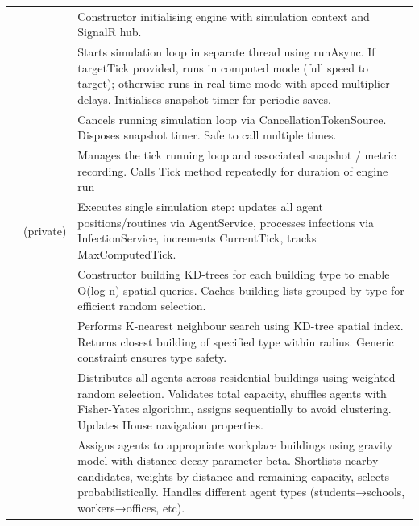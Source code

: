 \begin{longtable}{|L{4cm}|L{4cm}|L{6cm}|}
 & 
 & 
Constructor initialising engine with simulation context and SignalR hub. \\
&  & 
Starts simulation loop in separate thread using runAsync. If targetTick provided, runs in computed mode (full speed to target); otherwise runs in real-time mode with speed multiplier delays. Initialises snapshot timer for periodic saves. \\
&  & 
Cancels running simulation loop via CancellationTokenSource. Disposes snapshot timer. Safe to call multiple times. \\
&  & Manages the tick running loop and associated snapshot / metric recording. Calls Tick method repeatedly for duration of engine run\\
&  (private) & 
Executes single simulation step: updates all agent positions/routines via AgentService, processes infections via InfectionService, increments CurrentTick, tracks MaxComputedTick. \\
\hline

 & 
 & 
Constructor building KD-trees for each building type to enable O(log n) spatial queries. Caches building lists grouped by type for efficient random selection. \\
&  & 
Performs K-nearest neighbour search using KD-tree spatial index. Returns closest building of specified type within radius. Generic constraint ensures type safety. \\
&  & 
Distributes all agents across residential buildings using weighted random selection. Validates total capacity, shuffles agents with Fisher-Yates algorithm, assigns sequentially to avoid clustering. Updates House navigation properties. \\
&  & 
Assigns agents to appropriate workplace buildings using gravity model with distance decay parameter beta. Shortlists nearby candidates, weights by distance and remaining capacity, selects probabilistically. Handles different agent types (students→schools, workers→offices, etc). \\
\hline


\end{longtable}
